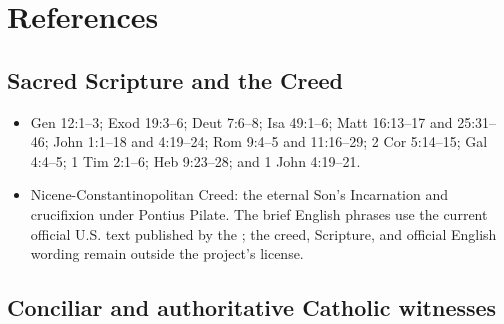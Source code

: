 \section{References}

\begingroup
\setlength{\parskip}{0pt}
\titlespacing*{\subsection}{0pt}{1.0ex}{0.3ex}

\subsection*{Sacred Scripture and the Creed}

{\fontsize{8.6}{9.6}\selectfont
\begin{itemize}[itemsep=0pt,parsep=0pt,topsep=0.05em]
\item Gen 12:1--3; Exod 19:3--6; Deut 7:6--8; Isa 49:1--6; Matt 16:13--17 and 25:31--46; John 1:1--18 and 4:19--24; Rom 9:4--5 and 11:16--29; 2 Cor 5:14--15; Gal 4:4--5; 1 Tim 2:1--6; Heb 9:23--28; and 1 John 4:19--21.
\item Nicene-Constantinopolitan Creed: the eternal Son's Incarnation and crucifixion under Pontius Pilate. The brief English phrases use the current official U.S. text published by the ; the creed, Scripture, and official English wording remain outside the project's license.
\end{itemize}}

\subsection*{Conciliar and authoritative Catholic witnesses}

